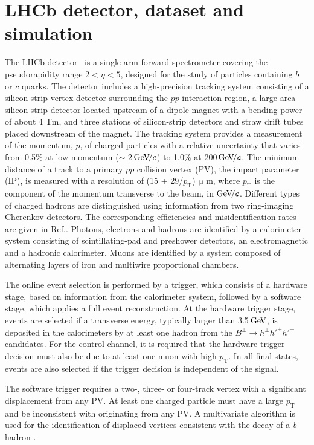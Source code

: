 \documentclass[12pt,a4paper]{article}
\def\to                 {\ensuremath{\rightarrow}\xspace}
\newcommand{\aunit}[1]{\ensuremath{\text{\,#1}}}
\newcommand{\gev}{\aunit{Ge\kern -0.1em V}\xspace}
\newcommand{\gevc}{\ensuremath{\aunit{Ge\kern -0.1em V\!/}c}\xspace}
\def\pt         {\ensuremath{p_{\mathrm{T}}}\xspace}
\begin{document}
\section{LHCb detector, dataset and simulation}
\label{sec:detector}

The LHCb detector~\cite{LHCb-DP-2008-001, LHCb-DP-2014-002} 
is a single-arm forward spectrometer covering the pseudorapidity range $2 < \eta < 5$, designed for the study of particles containing $b$ or $c$ quarks. The detector includes a high-precision tracking system consisting of a silicon-strip vertex  detector surrounding the $pp$ interaction region, a large-area silicon-strip detector located upstream of a dipole magnet with a bending power of about 4 Tm, and three stations of silicon-strip detectors and straw drift tubes placed downstream of the magnet. The tracking system provides a measurement of the momentum, $p$, of charged particles with a relative uncertainty that varies from 0.5\% at low momentum ($\sim$ 2\gevc) to 1.0\% at 200\gevc. 
The minimum distance of a track to a primary $pp$ collision vertex (PV), the impact parameter (IP), is measured with a resolution of (15 + 29/\pt)\,$\upmu$m, where \pt is the component of the momentum transverse to the beam, in\,\gevc. Different types of charged hadrons are distinguished using information from two ring-imaging Cherenkov detectors. The corresponding efficiencies and misidentification rates are given in Ref.\cite{Calabrese:2811056}. Photons, electrons and hadrons are identified by a calorimeter system consisting of scintillating-pad and preshower detectors, an electromagnetic and a hadronic calorimeter. Muons are identified by a system composed of alternating layers of iron and multiwire proportional chambers.

The online event selection is performed by a trigger, which consists of a hardware stage, based on information from the calorimeter system, followed by a software stage, which applies a full event reconstruction. 
At the hardware trigger stage, events are selected if a transverse energy, typically larger than 3.5\gev, is deposited in the calorimeters by at least one hadron from the $B^{\pm}\to h^{\pm}h'^+h'^-$ candidates.
For the control channel, it is required that the hardware trigger decision must also be due to at least one muon with high \pt. In all final states, events are also selected if the trigger decision is independent of the signal.

The software trigger requires a two-, three- or four-track vertex with a significant displacement from any PV. At least one charged particle must have a large \pt and be inconsistent with originating from any PV\@. A multivariate algorithm is used for the identification of displaced vertices consistent with the decay of a {\it b}-hadron \cite{LHCb-DP-2019-001}.
\end{document}
